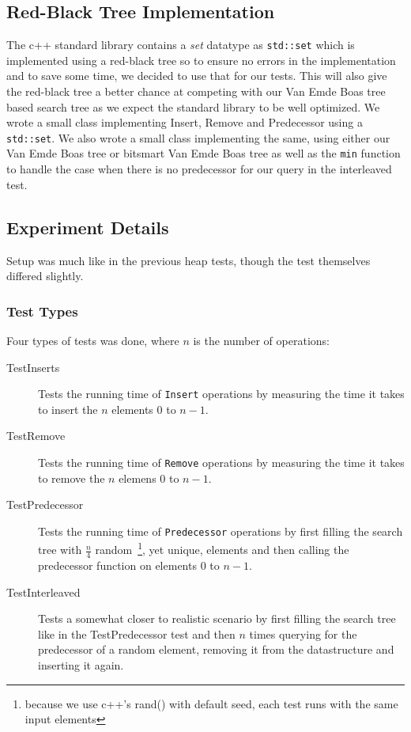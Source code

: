 \subsection{Red-Black Tree Implementation}
The c++ standard library contains a \textit{set} datatype as \texttt{std::set} which is implemented using a red-black tree so to ensure no errors in the implementation and to save some time, we decided to use that for our tests. This will also give the red-black tree a better chance at competing with our Van Emde Boas tree based search tree as we expect the standard library to be well optimized. We wrote a small class implementing Insert, Remove and Predecessor using a \texttt{std::set}. We also wrote a small class implementing the same, using either our Van Emde Boas tree or bitsmart Van Emde Boas tree as well as the \texttt{min} function to handle the case when there is no predecessor for our query in the interleaved test.

\subsection{Experiment Details}
Setup was much like in the previous heap tests, though the test themselves differed slightly.

\subsubsection{Test Types}
Four types of tests was done, where $n$ is the number of operations:
\begin{description}
\item[TestInserts] Tests the running time of \texttt{Insert} operations by measuring the time it takes to insert the $n$ elements $0$ to $n-1$.
\item[TestRemove] Tests the running time of \texttt{Remove} operations by measuring the time it takes to remove the $n$ elemens $0$ to $n-1$.
\item[TestPredecessor] Tests the running time of \texttt{Predecessor} operations by first filling the search tree with $\frac{n}{4}$ random~\footnote{because we use c++'s rand() with default seed, each test runs with the same input elements}, yet unique, elements and then calling the predecessor function on elements $0$ to $n-1$.
\item[TestInterleaved] Tests a somewhat closer to realistic scenario by first filling the search tree like in the TestPredecessor test and then $n$ times querying for the predecessor of a random element, removing it from the datastructure and inserting it again.
\end{description}

